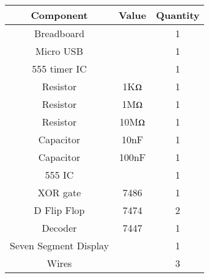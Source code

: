 
\begin{tabular}{|c|c|c|}
\hline
Component	&Value	&Quantity\\ \hline
Breadboard	&	&1\\ \hline
Micro USB	&	&1\\ \hline
555 timer IC	&	&1\\ \hline
Resistor	&1K$\ohm$	&1\\ \hline
Resistor	&1M$\ohm$ &1\\ \hline
Resistor	&10M$\ohm$	&1\\ \hline
Capacitor	&10nF	&1\\ \hline
Capacitor	&100nF	&1\\ \hline
555 IC	&	&1\\ \hline
XOR gate	&7486	&1\\ \hline
D Flip Flop 	&7474	&2\\ \hline
Decoder	&7447	&1\\ \hline
Seven Segment Display	&	&1\\ \hline
Wires	&	&3\\ \hline
\end{tabular}
